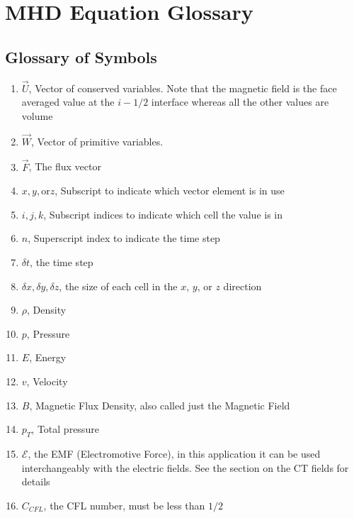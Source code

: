 \section{MHD Equation Glossary}
\label{sec:mhd-glossary}

\subsection*{Glossary of Symbols}

\begin{enumerate}
    \item $ \vec{U} $, Vector of conserved variables. Note that the magnetic field is the face averaged value at the $ i-1/2 $ interface whereas all the other values are volume
    \item $ \vec{W} $, Vector of primitive variables.
    \item $ \vec{F} $, The flux vector
    \item $ x, y, \text{or} z $, Subscript to indicate which vector element is in use
    \item $ i, j, k $, Subscript indices to indicate which cell the value is in
    \item $ n $, Superscript index to indicate the time step
    \item $ \delta t $, the time step
    \item $ \delta x, \delta y, \delta z $, the size of each cell in the $x$, $y$, or $z$ direction
    \item $\rho  $, Density
    \item $p  $, Pressure
    \item $E $, Energy
    \item $v  $, Velocity
    \item $B $, Magnetic Flux Density, also called just the Magnetic Field
    \item $p_T $, Total pressure
    \item $ \mathcal{E} $, the EMF (Electromotive Force), in this application it can be used interchangeably with the electric fields. See the section on the CT fields for details
    \item $ C_{CFL} $, the CFL number, must be less than $1/2$
\end{enumerate}